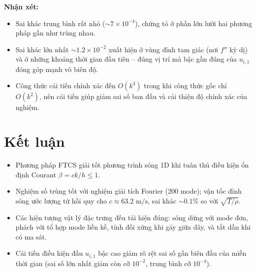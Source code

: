 \documentclass[12pt,a4paper]{article}
\begin{document}
\textbf{Nhận xét:}
\begin{itemize}[leftmargin=*]
    \item Sai khác trung bình rất nhỏ ($\sim 7\times 10^{-4}$), chứng tỏ ở phần lớn lưới hai phương pháp gần như trùng nhau.
    \item Sai khác lớn nhất $\sim 1.2\times 10^{-2}$ xuất hiện ở vùng đỉnh tam giác (nơi $f''$ kỳ dị) và ở những khoảng thời gian đầu tiên -- đúng vị trí mà bậc gần đúng của $u_{i,1}$ đóng góp mạnh vô biên độ.
    \item Công thức cải tiến chính xác đến $O(k^3)$ trong khi công thức gốc chỉ $O(k^2)$, nên cải tiến giúp giảm sai số ban đầu và cải thiện độ chính xác của nghiệm.
\end{itemize}

\section{Kết luận}

\begin{itemize}[leftmargin=*]
    \item Phương pháp FTCS giải tốt phương trình sóng 1D khi tuân thủ điều kiện ổn định Courant $\beta=ck/h\le 1$.
    \item Nghiệm số trùng tốt với nghiệm giải tích Fourier (200 mode); vận tốc đỉnh sóng ước lượng từ hồi quy cho $c\approx 63.2\text{ m/s}$, sai khác $\sim 0.1\%$ so với $\sqrt{T/\rho}$.
    \item Các hiện tượng vật lý đặc trưng đều tái hiện đúng: sóng dừng với mode đơn, phách với tổ hợp mode liền kề, tính đối xứng khi gảy giữa dây, và tắt dần khi có ma sát.
    \item Cải tiến điều kiện đầu $u_{i,1}$ bậc cao giảm rõ rệt sai số gần biên đầu của miền thời gian (sai số lớn nhất giảm còn cỡ $10^{-2}$, trung bình cỡ $10^{-4}$).
\end{itemize}
\end{document}

